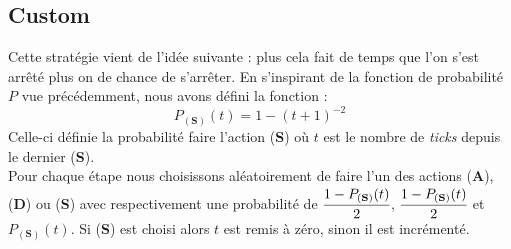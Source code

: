 \subsection{Custom}
Cette stratégie vient de l'idée suivante : plus cela fait de temps que l'on s'est arrêté plus on de chance de s'arrêter.
En s'inspirant de la fonction de probabilité $P$ vue précédemment, nous avons
défini la fonction :
$$P_{(\textbf{S})}(t) = 1 - (t + 1)^{-2}$$
Celle-ci définie la probabilité faire l'action (\textbf{S}) où $t$ est le nombre de \emph{ticks} depuis
le dernier (\textbf{S}).\\
Pour chaque étape nous choisissons aléatoirement de faire l'un des actions  
(\textbf{A}), (\textbf{D}) ou (\textbf{S}) avec respectivement une probabilité
de $\cfrac{1 - P_{(\textbf{S})}(t)}{2}$, $\cfrac{1 - P_{(\textbf{S})}(t)}{2}$ et $P_{(\textbf{S})}(t)$. Si (\textbf{S}) est choisi
alors $t$ est remis à zéro, sinon il est incrémenté.